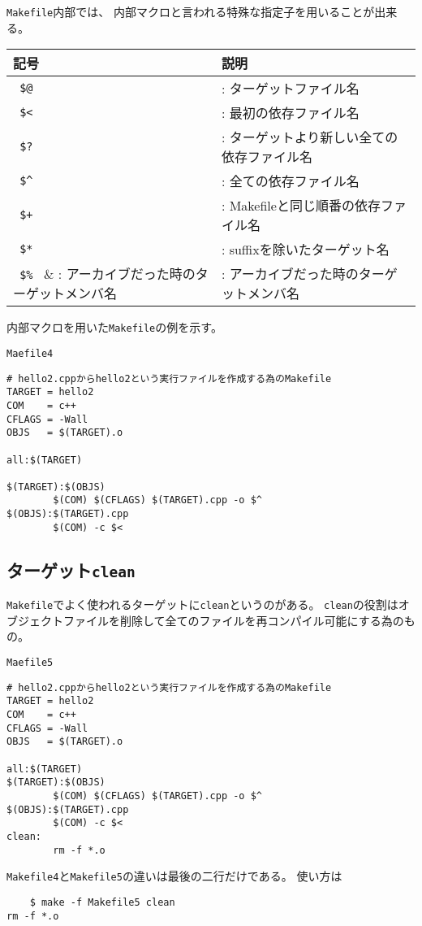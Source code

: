 \verb|Makefile|内部では、
内部マクロと言われる特殊な指定子を用いることが出来る。

\begin{table}[H]
   \begin{tabular}{ll} \hline
    記号        & 説明 \\ \midrule
    \verb| $@ | &	: ターゲットファイル名 \\
    \verb| $< | &	: 最初の依存ファイル名 \\
    \verb| $? | &	: ターゲットより新しい全ての依存ファイル名 \\
    \verb| $^ | &	: 全ての依存ファイル名 \\
    \verb| $+ | &	: Makefileと同じ順番の依存ファイル名 \\
    \verb| $* | &	: suffixを除いたターゲット名 \\
    \verb| $% | &	: アーカイブだった時のターゲットメンバ名 \\ 
	\hline
  \end{tabular}
\end{table}

内部マクロを用いた\texttt{Makefile}の例を示す。
\begin{itembox}{\texttt{Maefile4}}
 \begin{verbatim}
# hello2.cppからhello2という実行ファイルを作成する為のMakefile
TARGET = hello2
COM    = c++
CFLAGS = -Wall
OBJS   = $(TARGET).o

all:$(TARGET)

$(TARGET):$(OBJS)
        $(COM) $(CFLAGS) $(TARGET).cpp -o $^
$(OBJS):$(TARGET).cpp
        $(COM) -c $<
 \end{verbatim}
\end{itembox}




\subsection{ターゲット\texttt{clean}}

\verb|Makefile|でよく使われるターゲットに\texttt{clean}というのがある。
\texttt{clean}の役割はオブジェクトファイルを削除して全てのファイルを再コンパイル可能にする為のもの。
\begin{itembox}{\texttt{Maefile5}}
 \begin{verbatim}
# hello2.cppからhello2という実行ファイルを作成する為のMakefile
TARGET = hello2
COM    = c++
CFLAGS = -Wall
OBJS   = $(TARGET).o

all:$(TARGET)
$(TARGET):$(OBJS)
        $(COM) $(CFLAGS) $(TARGET).cpp -o $^
$(OBJS):$(TARGET).cpp
        $(COM) -c $<
clean:
        rm -f *.o \end{verbatim}
\end{itembox}
\texttt{Makefile4}と\texttt{Makefile5}の違いは最後の二行だけである。
使い方は
\begin{verbatim}
	$ make -f Makefile5 clean
rm -f *.o
\end{verbatim}